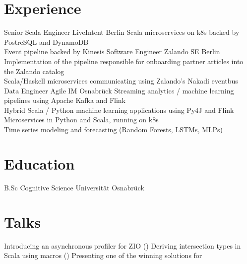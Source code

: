 \documentclass[10pt,a4paper,sans]{moderncv}
\begin{document}
\makecvtitle

\section{Experience}
        {Senior Scala Engineer}
        {LiveIntent}
        {Berlin}
        {}
        {Scala microservices on k8s backed by PostreSQL and DynamoDB \\
         Event pipeline backed by Kinesis}
        {Software Engineer}
        {Zalando SE}
        {Berlin}
        {}
        {Implementation of the pipeline responsible for onboarding partner articles into the Zalando catalog \\
         Scala/Haskell microservices communicating using Zalando's Nakadi eventbus}
        {Data Engineer}
        {Agile IM}
        {Osnabrück}
        {}
        {Streaming analytics / machine learning pipelines using Apache Kafka and Flink \\
         Hybrid Scala / Python machine learning applications using Py4J and Flink \\
         Microservices in Python and Scala, running on k8s \\
         Time series modeling and forecasting (Random Forests, LSTMs, MLPs)}

\section{Education}
\cventry{}
        {B.Sc Cognitive Science}
        {Universität Osnabrück}
        {}
        {}
        {}

\section{Talks}
       {Introducing an asynchronous profiler for ZIO ()}
       {Deriving intersection types in Scala using macros ()}
       {Presenting one of the winning solutions for }
\end{document}
